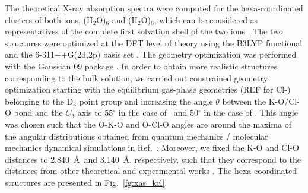 The theoretical X-ray absorption spectra were computed for the hexa-coordinated clusters of both ions, \ki(H$_2$O)$_6$ and \cli(H$_2$O)$_6$, which can be considered as representatives of the complete first solvation shell of the two ions \citep{Ohtaki93:1157,soper06:180,ma14:1006}. The two structures were optimized at the DFT level of theory using the B3LYP functional and the 6-311++G(2d,2p) basis set \citep{Krishnan80:650,Blaudeau97:5016}. The geometry optimization was performed with the Gaussian 09 package \citep{g09}. In order to obtain more realistic structures corresponding to the bulk solution, we carried out constrained geometry optimization starting with the equilibrium gas-phase geometries \citep{lee99:3995}(REF for Cl-) belonging to the D$_3$ point group and increasing the angle $\theta$ between the K-O/Cl-O bond and the $C_3$ axis to 55$^{\circ}$ in the case of \ki~and 50$^{\circ}$ in the case of \cli. This angle was chosen such that the O-K-O and O-Cl-O angles are around the maxima of the angular distributions obtained from quantum mechanics / molecular mechanics dynamical simulations in Ref.\ \citep{ma14:1006}. Moreover, we fixed the K-O and Cl-O distances to 2.840~\AA~and 3.140~\AA, respectively, such that they correspond to the distances from other theoretical and experimental works \citep{ge13:13169,gora00:7,Ohtaki93:1157,soper06:180,ma14:1006}. The hexa-coordinated structures are presented in Fig.\ \ref{fg:xas_kcl}. %


